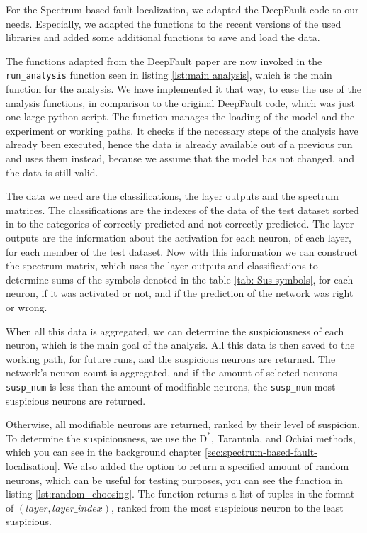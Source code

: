 For the Spectrum-based fault localization, we adapted the DeepFault \cite{eniser_deepfault_2023} code to our needs.
Especially, we adapted the functions to the recent versions of the used libraries and added some additional functions to save and load the data.

The functions adapted from the DeepFault paper are now invoked in the \texttt{run\_analysis} function seen in listing \ref{lst:main analysis}, which is the main function for the analysis.
We have implemented it that way, to ease the use of the analysis functions, in comparison to the original DeepFault code, which was just one large python script.
The function manages the loading of the model and the experiment or working paths.
It checks if the necessary steps of the analysis have already been executed, hence the data is already available out of a previous run and uses them instead, because we assume that the model has not changed, and the data is still valid.

The data we need are the classifications, the layer outputs and the spectrum matrices.
The classifications are the indexes of the data of the test dataset sorted in to the categories of correctly predicted and not correctly predicted.
The layer outputs are the information about the activation for each neuron, of each layer, for each member of the test dataset.
Now with this information we can construct the spectrum matrix, which uses the layer outputs and classifications to determine sums of the symbols denoted in the table \ref{tab: Sus symbols}, for each neuron, if it was activated or not, and if the prediction of the network was right or wrong.

When all this data is aggregated, we can determine the suspiciousness of each neuron, which is the main goal of the analysis.
All this data is then saved to the working path, for future runs, and the suspicious neurons are returned.
The network's neuron count is aggregated, and if the amount of selected neurons \texttt{susp\_num} is less than the amount of modifiable neurons, the \texttt{susp\_num} most suspicious neurons are returned.

Otherwise, all modifiable neurons are returned, ranked by their level of suspicion.
To determine the suspiciousness, we use the $\text{D}^*$, Tarantula, and Ochiai methods, which you can see in the background chapter \ref{sec:spectrum-based-fault-localisation}.
We also added the option to return a specified amount of random neurons, which can be useful for testing purposes, you can see the function in listing \ref{lst:random_choosing}.
The function returns a list of tuples in the format of $(layer, layer\_index)$, ranked from the most suspicious neuron to the least suspicious.

